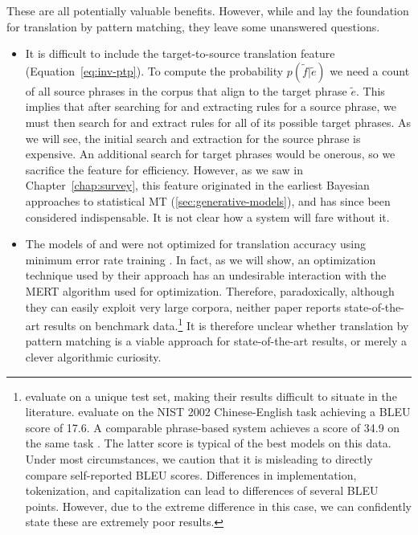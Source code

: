 \noindent These are all potentially valuable benefits.  However, 
while \citet{Callison-Burch:2005:acl} and \citet{Zhang:2005:eamt}
lay the foundation for translation by pattern matching, they leave
some unanswered questions.

\begin{itemize}
	\item It is difficult to include the target-to-source translation
	feature (Equation~\ref{eq:inv-ptp}).  To compute the 
	probability $p(\tilde{f}|\tilde{e})$ we need a count of 
	all source phrases in the corpus that align to the target
	phrase $\tilde{e}$.  This implies that after searching for and
	extracting rules for a source phrase, we must then search for 
	and extract rules for all of its possible target phrases.
	As we will see, the initial search and extraction for the source
	phrase is expensive.  An additional search for target 
	phrases would be onerous, so we sacrifice the feature for efficiency.  
	However, as we saw in Chapter~\ref{chap:survey}, 
	this feature originated in the earliest Bayesian approaches to 
	statistical MT (\textsection\ref{sec:generative-models}), 
	and has since been considered indispensable.  It is not
	clear how a system will fare without it.

	\item The models of \citet{Callison-Burch:2005:acl} and \citet{Zhang:2005:eamt}
	were not optimized for translation accuracy using minimum error rate training
	\citep[see \textsection\ref{sec:minimum-error-rate-training}]{Och:2003:acl}.
	In fact, as we will show, an optimization technique used by their approach
	has an undesirable interaction with the MERT algorithm
	\cite[\textsection\ref{sec:minimum-error-rate-training}]{Och:2003:acl}
	used for optimization.  Therefore, paradoxically, although they can easily exploit 
	very large corpora, neither paper reports state-of-the-art results on 
	benchmark data.\footnote{\citet{Callison-Burch:2005:acl} evaluate on a 
	unique test set, making their results difficult to situate in
	the literature.  \citet{Zhang:2005:eamt} evaluate on the
	NIST 2002 Chinese-English task achieving a BLEU
	score of 17.6.  A comparable phrase-based system achieves a score
	of 34.9 on the same task \citep{DeNeefe:2007:emnlp-conll}.  The latter score is 
	typical of the best models on this data.  Under most circumstances,
	we caution that it is misleading to directly compare self-reported 
	BLEU scores.  Differences in implementation, tokenization, and capitalization 
	can lead to differences of several BLEU points.  However, due to the 
	extreme difference in this case, we can confidently state these are 
	extremely poor results.}  It is therefore unclear whether translation by pattern 
	matching is a viable approach for state-of-the-art 
	results, or merely a clever algorithmic curiosity.


\end{itemize}
